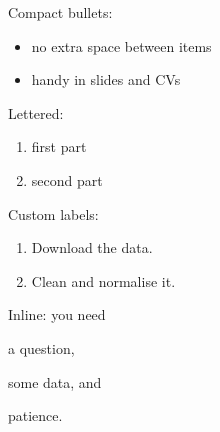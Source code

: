 \documentclass{article}
\begin{document}
Compact bullets:
\begin{itemize}[noitemsep, topsep=2pt]
  \item no extra space between items
  \item handy in slides and CVs
\end{itemize}

Lettered:
\begin{enumerate}[label=(\alph*), noitemsep]
  \item first part
  \item second part
\end{enumerate}

Custom labels:
\begin{enumerate}[label=\textbf{Step \arabic*:}, leftmargin=*, align=left, noitemsep]
  \item Download the data.
  \item Clean and normalise it.
\end{enumerate}

Inline: you need
\begin{enumerate*}[label=(\roman*)]
  \item a question,
  \item some data, and
  \item patience.
\end{enumerate*}
\end{document}
